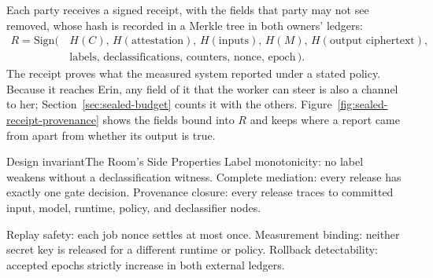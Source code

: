 \documentclass[11pt,a4paper]{article}
\theoremstyle{definition}
\begin{document}
Each party receives a signed receipt, with the fields that party may not see
removed, whose hash is recorded in a Merkle tree in both owners' ledgers:
{\small\[
\begin{aligned}
R=\mathrm{Sign}\bigl(\, & H(C),\,H(\text{attestation}),\,H(\text{inputs}),\,H(M),\,H(\text{output ciphertext}),\\
& \text{labels},\,\text{declassifications},\,\text{counters},\,\text{nonce},\,\text{epoch}\,\bigr).
\end{aligned}
\]} The receipt proves what the
measured system reported under a stated policy. Because it reaches Erin, any
field of it that the worker can steer is also a channel to her;
Section~\ref{sec:sealed-budget} counts it with the others.
Figure~\ref{fig:sealed-receipt-provenance} shows the fields bound into $R$ and
keeps where a report came from apart from whether its output is true.



\ifdefined\pdswisslandmarkplate
\begin{figure}[p]
  \centering
\end{figure}
\pdmarginpagebreak
\fi

\begin{pdclaim}{Design invariant}{The Room's Side Properties}
\setlength{\parskip}{4pt plus 1pt}
\label{inv:sealed-side}
Label monotonicity: no label weakens without a declassification witness.
Complete mediation: every release has exactly one gate decision. Provenance
closure: every release traces to committed input, model, runtime, policy, and
declassifier nodes.

Replay safety: each job nonce settles at most once.
Measurement binding: neither secret key is released for a different runtime
or policy. Rollback detectability: accepted epochs strictly increase in both
external ledgers.
\end{pdclaim}

\ifdefined\pdbookfontprofile
\fi
\end{document}

